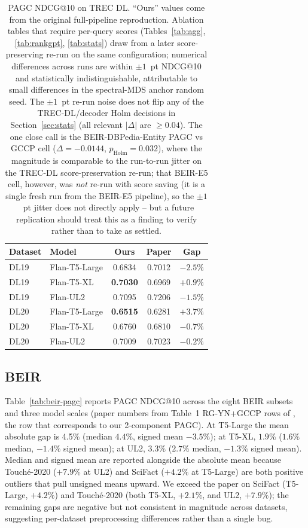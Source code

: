 \documentclass[sigconf]{acmart}
\begin{document}
\begin{table}[t]
\centering
\small
\begin{tabular}{llccc}
\toprule
\textbf{Dataset} & \textbf{Model} & \textbf{Ours} & \textbf{Paper} & \textbf{Gap} \\
\midrule
DL19 & Flan-T5-Large & 0.6834 & 0.7012 & $-2.5\%$ \\
DL19 & Flan-T5-XL    & \textbf{0.7030} & 0.6969 & $+0.9\%$ \\
DL19 & Flan-UL2      & 0.7095 & 0.7206 & $-1.5\%$ \\
\midrule
DL20 & Flan-T5-Large & \textbf{0.6515} & 0.6281 & $+3.7\%$ \\
DL20 & Flan-T5-XL    & 0.6760 & 0.6810 & $-0.7\%$ \\
DL20 & Flan-UL2      & 0.7009 & 0.7023 & $-0.2\%$ \\
\bottomrule
\end{tabular}
\caption{PAGC NDCG@10 on TREC DL. ``Ours'' values come from the
original full-pipeline reproduction. Ablation tables that require
per-query scores (Tables~\ref{tab:agg}, \ref{tab:rankgpt},
\ref{tab:stats}) draw from a later score-preserving re-run on the
same configuration; numerical differences across runs are within
$\pm 1$~pt NDCG@10 and statistically indistinguishable, attributable
to small differences in the spectral-MDS anchor random seed. The
$\pm 1$~pt re-run noise does not flip any of the TREC-DL/decoder
Holm decisions in Section~\ref{sec:stats} (all relevant $|\Delta|$
are $\geq 0.04$). The one close call is the BEIR-DBPedia-Entity
PAGC vs GCCP cell ($\Delta=-0.0144$, $p_{\text{Holm}}=0.032$),
where the magnitude is comparable to the run-to-run jitter on the
TREC-DL score-preservation re-run; that BEIR-E5 cell, however, was
\emph{not} re-run with score saving (it is a single fresh run from
the BEIR-E5 pipeline), so the $\pm 1$~pt jitter does not directly
apply -- but a future replication should treat this as a finding
to verify rather than to take as settled.}
\label{tab:dl-pagc}
\end{table}

\subsection{BEIR}
Table~\ref{tab:beir-pagc} reports PAGC NDCG@10 across the eight BEIR
subsets and three model scales (paper numbers from Table~1
RG-YN+GCCP rows of \cite{long2025precise}, the row that corresponds
to our 2-component PAGC). At T5-Large the mean absolute gap is
4.5\% (median $4.4\%$, signed mean $-3.5\%$); at T5-XL,
$1.9\%$ ($1.6\%$ median, $-1.4\%$ signed mean); at UL2,
$3.3\%$ ($2.7\%$ median, $-1.3\%$ signed mean). Median and signed
mean are reported alongside the absolute mean because Touch\'e-2020
($+7.9\%$ at UL2) and SciFact ($+4.2\%$ at T5-Large) are both
positive outliers that pull unsigned means upward. We exceed the
paper on SciFact (T5-Large, $+4.2\%$) and Touch\'e-2020 (both
T5-XL, $+2.1\%$, and UL2, $+7.9\%$); the remaining gaps are
negative but not consistent in magnitude across datasets,
suggesting per-dataset preprocessing differences rather than a
single bug.
\end{document}
